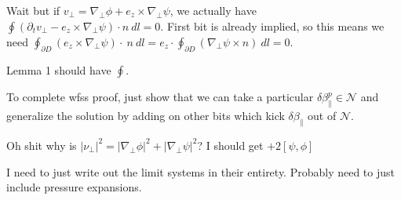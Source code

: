 \documentclass{article}
\newcommand{\para}{\parallel}
\newcommand{\np}{\nabla_\perp}
\newcommand{\p}{\partial}
\newcommand{\br} [1] {\left[ #1 \right] }
\begin{document}
Wait but if $v_\perp=\np\phi + e_z\times\np\psi$, we actually have $\oint (\p_tv_\perp - e_z\times\np\psi) \cdot n\ dl =0$. First bit is already implied, so this means we need $\oint_{\p D} (e_z\times\np\psi)\cdot\ n\ dl= e_z\cdot \oint_{\p D} (\np\psi\times n)\ dl =0$. 

Lemma 1 should have $\oint$.

To complete wfss proof, just show that we can take a particular $\delta\beta_\para^p\in\mathcal{N}$ and generalize the solution by adding on other bits which kick $\delta\beta_\para$ out of $\mathcal{N}$. 

Oh shit why is $|\nu_\perp|^2 = |\np\phi|^2 + |\np\psi|^2$? I should get $+2\br{\psi,\phi}$

I need to just write out the limit systems in their entirety. Probably need to just include pressure expansions. 
\end{document}
